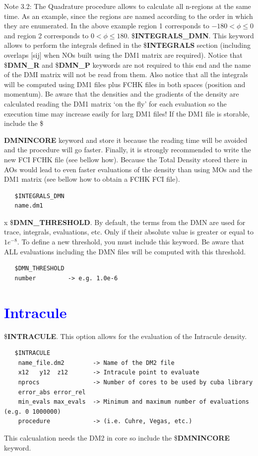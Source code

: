 \documentclass[10pt,a4paper]{article}
\newcommand{\tbl}[1]{{\textcolor{blue}{#1}}}
\begin{document}
\newline
Note 3.2: The Quadrature procedure allows to calculate all n-regions at the same time. As an example, since the regions are named according to the order in which they are enumerated. In the above example region 1 corresponds to $-180 <\phi \leq 0$ and region 2 corresponds to $0 <\phi \leq 180$. \newline
\newline
\newline
\noindent \$\textbf{INTEGRALS\_DMN}. This keyword allows to perform the integrals defined in the \$\textbf{INTEGRALS} section (including overlaps $[$sij$]$ when NOs built using the DM1 matrix are required). Notice that \$\textbf{DMN\_R} and \$\textbf{DMN\_P} keywords are not required to this end and the name of the DMI matrix will not be read from them. Also notice that all the integrals will be computed using DM1 files plus FCHK files in both spaces (position and momentum). Be aware that the densities and the gradients of the density are calculated reading the DM1 matrix `on the fly' for each evaluation so the execution time may increase easily for larg DM1 files! If the DM1 file is storable, include the \${\textbf{DMNINCORE} keyword and store it because the reading time will be avoided and the procedure will go faster. Finally, it is strongly recommended to write the new FCI FCHK file (see bellow how). Because the Total Density stored there in AOs would lead to even faster evaluations of the density than using MOs and the DM1 matrix (see bellow how to obtain a FCHK FCI file). 
\begin{verbatim}
   $INTEGRALS_DMN
   name.dm1
\end{verbatim}
{\color{white} x}
\newline
\newline 
\noindent \$\textbf{DMN\_THRESHOLD}. By default, the terms from the DMN are used for trace, integrals, evaluations, etc. Only if their absolute value is greater or equal to $1e^{-8}$. To define a new threshold, you must include this keyword. Be aware that ALL evaluations including the DMN files will be computed with this threshold.
\begin{verbatim}
   $DMN_THRESHOLD
   number         -> e.g. 1.0e-6
\end{verbatim} 
\section{\tbl{\textbf{Intracule}}}
\noindent \$\textbf{INTRACULE}. This option allows for the evaluation of the Intracule density.\newline
\begin{verbatim}
   $INTRACULE
    name_file.dm2        -> Name of the DM2 file
    x12   y12  z12       -> Intracule point to evaluate 
    nprocs               -> Number of cores to be used by cuba library
    error_abs error_rel    
    min_evals max_evals  -> Minimum and maximum number of evaluations (e.g. 0 1000000)
    procedure            -> (i.e. Cuhre, Vegas, etc.)
\end{verbatim}
This calcualation needs the DM2 in core so include the \$\textbf{DMNINCORE} keyword.
}
\end{document}
